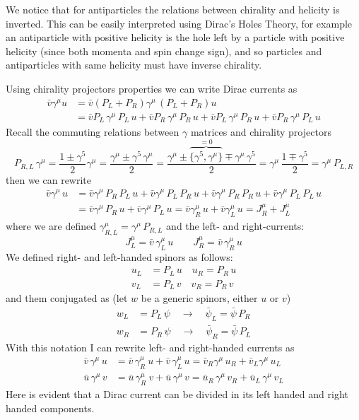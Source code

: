 \documentclass[TheoreticalPhy_ModB.tex]{subfiles}
\begin{document}
We notice that for antiparticles the relations between chirality and helicity is inverted. This can be easily interpreted using Dirac's Holes Theory, for example an antiparticle with positive helicity is the hole left by a particle with positive helicity (since both momenta and spin change sign), and so particles and antiparticles with same helicity must have inverse chirality.

Using chirality projectors properties we can write Dirac currents as
\[
\begin{split}
\bar{v}\gamma^{\mu}u 	& = \bar{v}(P_L + P_R) \gamma^{\mu} \, (P_L +P_R) u \\
					& = \bar{v} P_L \, \gamma^{\mu} \, P_L \, u + \bar{v} P_R \, \gamma^{\mu} \, P_R \, u
					+ \bar{v} P_L \, \gamma^{\mu} \, P_R \, u + \bar{v} P_R \, \gamma^{\mu} \, P_L \, u
\end{split}
\]
Recall the commuting relations between $\gamma$ matrices and chirality projectors
\[
P_{R,L} \, \gamma^{\mu} 
	=\frac{1\pm\gamma^5}2\gamma^\mu
	= \frac{\gamma^{\mu} \pm \gamma^5 \, \gamma^{\mu}}{2} 
	= \frac{ \gamma^{\mu} \pm \overbrace{\{ \gamma^5, \gamma^{\mu} \}}^{=0} \mp \gamma^{\mu} \, \gamma^5}{2}
	= \gamma^{\mu} \, \frac{1 \mp \gamma^5}{2} = \gamma^{\mu} \, P_{L, R}
\]
then we can rewrite
\[
\begin{split}
\bar{v}\gamma^{\mu} \, u 
	& = \bar{v} \gamma^{\mu} \, P_R \, P_L \, u + \bar{v} \gamma^{\mu} \, P_L \, P_R \, u
	+ \bar{v} \gamma^{\mu} \, P_R \, P_R \, u + \bar{v} \gamma^{\mu} \, P_L \, P_L \, u \\
	& = \bar{v} \gamma^{\mu} \, P_R \, u + \bar{v} \gamma^{\mu} \, P_L \, u
	= \bar{v} \gamma^{\mu}_R \, u + \bar{v} \gamma^{\mu}_L \, u = J^{\mu}_R + J^{\mu}_L
\end{split}
\]
where we are defined $\gamma^{\mu}_{R, L} = \gamma^{\mu} \, P_{R,L}$ and the left- and right-currents:
\[
J_L^{\mu} = \bar{v} \, \gamma^{\mu}_L \, u
\qquad
J_R^{\mu} = \bar{v} \, \gamma_R^{\mu} \, u
\]
We defined right- and left-handed spinors as follows:
\begin{align*}
u_L 	& = P_L \, u 	\quad	u_R = P_R \, u \\
v_L 	& = P_L \, v	\quad	v_R = P_R \, v
\end{align*}
and them conjugated as (let $w$ be a generic spinors, either $u$ or $v$)
\begin{align*}
w_L 	& = P_L \, \psi \quad \to \quad \bar{\psi}_L = \bar{\psi} \, P_R \\
w_R 	& = P_R \, \psi \quad \to \quad \bar{\psi}_R = \bar{\psi} \, P_L
\end{align*}
With this notation I can rewrite left- and right-handed currents as
\begin{align*}
\bar{v} \, \gamma^{\mu} \, u 	& = \bar{v} \, \gamma^{\mu}_R \ u + \bar{v} \, \gamma_L^{\mu} \, u 	
	= \bar{v}_R \gamma^{\mu} \, u_R + \bar{v}_L \gamma^{\mu} \,  u_L \\
\bar{u} \, \gamma^{\mu} \, v 	& = \bar{u} \, \gamma^{\mu}_R \ v + \bar{u} \, \gamma^{\mu} \, v
	= \bar{u}_R \, \gamma^{\mu} \, v_R + \bar{u}_L \, \gamma^{\mu} \, v_L
\end{align*}
Here is evident that a Dirac current can be divided in its left handed and right handed components.
\end{document}
